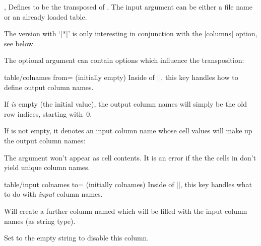 \begin{commandlist}{%
	\pgfplotstabletranspose{},%
	\pgfplotstabletranspose*{}}%
	Defines  to be the transposed of . The input argument can be either a file name or an already loaded table.

	The version with `|*|' is only interesting in conjunction with the |columns| option, see below.

\begin{codeexample}[]
\end{codeexample}

\begin{codeexample}[]
\pgfplotstabletranspose{}
\loadedtable
\end{codeexample}

	The optional argument  can contain options which influence the transposition:
	\begin{pgfplotskey}{table/colnames from= (initially empty)}
		Inside of |\pgfplotstabletranspose|, this key handles how to define output column names.
		
		If  \emph{is} empty (the initial value), the output column names will simply be the old row indices, starting with~$0$.

		If  is not empty, it denotes an input column name whose cell values will make up the output column names:
\begin{codeexample}[]
\pgfplotstabletranspose[colnames from=c]
\loadedtable
\end{codeexample}
		The argument  won't appear as cell contents. It is an error if the the cells in  don't yield unique column names.
	\end{pgfplotskey}

	\begin{pgfplotskey}{table/input colnames to= (initially colnames)}
		Inside of |\pgfplotstabletranspose|, this key handles what to do with \emph{input} column names.

		Will create a further column named  which will be filled with the input column names (as string type).
\begin{codeexample}[]
\pgfplotstabletranspose[input colnames to=Input]
\loadedtable
\end{codeexample}
		Set  to the empty string to disable this column.
\begin{codeexample}[]
\pgfplotstabletranspose[input colnames to=]
\loadedtable
\end{codeexample}
	\end{pgfplotskey}


\end{commandlist}
